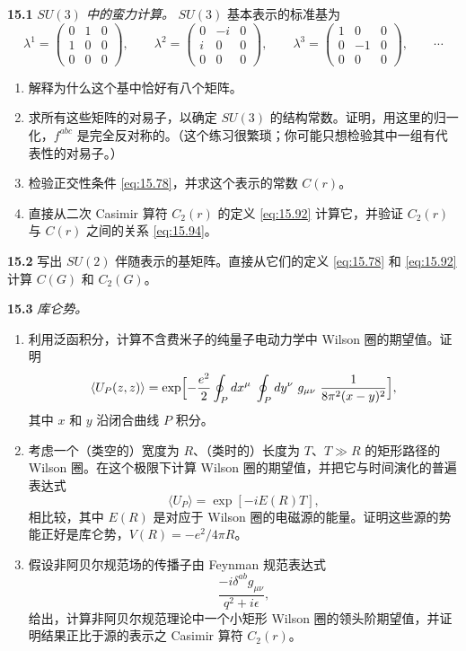 \problems

\textbf{15.1} \emph{$SU(3)$ 中的蛮力计算。}  $SU(3)$ 基本表示的标准基为
\begin{equation}
  \lambda^1 = \begin{pmatrix}0&1&0\\1&0&0\\0&0&0\end{pmatrix},\qquad
  \lambda^2 = \begin{pmatrix}0&-i&0\\i&0&0\\0&0&0\end{pmatrix},\qquad
  \lambda^3 = \begin{pmatrix}1&0&0\\0&-1&0\\0&0&0\end{pmatrix},\qquad
  \cdots
\end{equation}
\begin{enumerate}[label=(\alph*)]
  \item 解释为什么这个基中恰好有八个矩阵。
  \item 求所有这些矩阵的对易子，以确定 $SU(3)$ 的结构常数。证明，用这里的归一化，$f^{abc}$ 是完全反对称的。（这个练习很繁琐；你可能只想检验其中一组有代表性的对易子。）
  \item 检验正交性条件 \eqref{eq:15.78}，并求这个表示的常数 $C(r)$。
  \item 直接从二次 Casimir 算符 $C_2(r)$ 的定义 \eqref{eq:15.92} 计算它，并验证 $C_2(r)$ 与 $C(r)$ 之间的关系 \eqref{eq:15.94}。
\end{enumerate}

\textbf{15.2} 写出 $SU(2)$ 伴随表示的基矩阵。直接从它们的定义 \eqref{eq:15.78} 和 \eqref{eq:15.92} 计算 $C(G)$ 和 $C_2(G)$。

\textbf{15.3} \emph{库仑势。}
\begin{enumerate}[label=(\alph*)]
  \item 利用泛函积分，计算不含费米子的纯量子电动力学中 Wilson 圈的期望值。证明
    \begin{equation}
      \langle U_P(z,z) \rangle = \exp\Bigl[ -\frac{e^2}{2}\oint_P dx^\mu\;
        \oint_P dy^\nu\ g_{\mu\nu}\ \frac{1}{8\pi^2(x-y)^2} \Bigr] ,
    \end{equation}
    其中 $x$ 和 $y$ 沿闭合曲线 $P$ 积分。
  \item 考虑一个（类空的）宽度为 $R$、（类时的）长度为 $T$、$T\gg R$ 的矩形路径的 Wilson 圈。在这个极限下计算 Wilson 圈的期望值，并把它与时间演化的普遍表达式
    \begin{equation}
      \langle U_P \rangle = \exp[-iE(R)T] ,
    \end{equation}
    相比较，其中 $E(R)$ 是对应于 Wilson 圈的电磁源的能量。证明这些源的势能正好是库仑势，$V(R) = -e^2/4\pi R$。
  \item 假设非阿贝尔规范场的传播子由 Feynman 规范表达式
    \begin{equation}
      \frac{-i\delta^{ab}g_{\mu\nu}}{q^2+i\epsilon} ,
    \end{equation}
    给出，计算非阿贝尔规范理论中一个小矩形 Wilson 圈的领头阶期望值，并证明结果正比于源的表示之 Casimir 算符 $C_2(r)$。
\end{enumerate}
